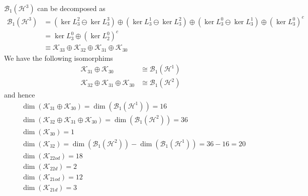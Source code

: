 \documentclass[aps,preprint]{revtex4}%
\begin{document}
$\mathcal{B}_{1}\left(  \mathcal{H}^{3}\right)  $ can be decomposed as
\begin{align}
\mathcal{B}_{1}\left(  \mathcal{H}^{3}\right)   &  =\left(  \ker L_{3}%
^{2}\ominus\ker L_{3}^{3}\right)  \oplus\left(  \ker L_{3}^{1}\ominus\ker
L_{3}^{2}\right)  \oplus\left(  \ker L_{3}^{0}\ominus\ker L_{3}^{1}\right)
\oplus\left(  \ker L_{3}^{0}\right)  ^{c}\nonumber\\
&  =\ker L_{3}^{0}\oplus\left(  \ker L_{2}^{0}\right)  ^{c}\nonumber\\
&  \equiv\mathcal{K}_{33}\oplus\mathcal{K}_{32}\oplus\mathcal{K}_{31}%
\oplus\mathcal{K}_{30}%
\end{align}
\bigskip We have the following isomorphims%
\begin{align}
\mathcal{K}_{31}\oplus\mathcal{K}_{30}  & \cong\mathcal{B}_{1}\left(
\mathcal{H}^{1}\right)  \nonumber\\
\mathcal{K}_{32}\oplus\mathcal{K}_{31}\oplus\mathcal{K}_{30}  & \cong
\mathcal{B}_{1}\left(  \mathcal{H}^{2}\right)
\end{align}
and hence%
\begin{align}
&  \dim\left(  \mathcal{K}_{31}\oplus\mathcal{K}_{30}\right)  =\dim\left(
\mathcal{B}_{1}\left(  \mathcal{H}^{1}\right)  \right)  =16\nonumber\\
&  \dim\left(  \mathcal{K}_{32}\oplus\mathcal{K}_{31}\oplus\mathcal{K}%
_{30}\right)  =\dim\left(  \mathcal{B}_{1}\left(  \mathcal{H}^{2}\right)
\right)  =36\\
&  \dim\left(  \mathcal{K}_{30}\right)  =1\nonumber\\
&  \dim\left(  \mathcal{K}_{32}\right)  =\dim\left(  \mathcal{B}_{1}\left(
\mathcal{H}^{2}\right)  \right)  -\dim\left(  \mathcal{B}_{1}\left(
\mathcal{H}^{1}\right)  \right)  =36-16=20\nonumber\\
&  \dim\left(  \mathcal{K}_{22od}\right)  =18\nonumber\\
&  \dim\left(  \mathcal{K}_{22d}\right)  =2\nonumber\\
&  \dim\left(  \mathcal{K}_{21od}\right)  =12\nonumber\\
&  \dim\left(  \mathcal{K}_{21d}\right)  =3
\end{align}
\end{document}

